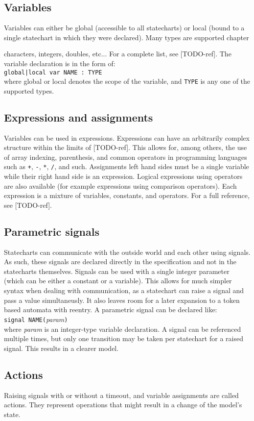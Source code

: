  \subsection{Variables}
Variables can either be global (accessible to all statecharts) or local (bound to a single statechart in which they were declared). Many types are supported chapter{ characters, integers, doubles, etc... For a complete list, see [TODO-ref]. The variable declaration is in the form of: \\\verb!global|local var NAME : TYPE!\\ where global or local denotes the scope of the variable, and \verb!TYPE! is any one of the supported types.
  \subsection{Expressions and assignments}
Variables can be used in expressions. Expressions can have an arbitrarily complex structure within the limits of [TODO-ref]. This allows for, among others, the use of array indexing, parenthesis, and common operators in programming languages such as \verb!+!, \verb!-!, \verb!*!, \verb!/!, and such. Assignments left hand sides must be a single variable while their right hand side is an expression. Logical expressions using operators are also available (for example expressions using comparison operators). Each expression is a mixture of variables, constants, and operators. For a full reference, see [TODO-ref].
  \subsection{Parametric signals}
Statecharts can communicate with the outside world and each other using signals. As such, these signals are declared directly in the specification and not in the statecharts themselves. Signals can be used with a single integer parameter (which can be either a constant or a variable). This allows for much simpler syntax when dealing with communication, as a statechart can raise a signal and pass a value simultaneusly. It also leaves room for a later expansion to a token based automata with reentry.
A parametric signal can be declared like: \\\verb!signal NAME(!\textit{param}\verb!)!\\ where \textit{param} is an integer-type variable declaration. A signal can be referenced multiple times, but only one transition may be taken per statechart for a raised signal. This results in a clearer model.
  \subsection{Actions}
Raising signals with or without a timeout, and variable assignments are called actions. They represent operations that might result in a change of the model's state.
}
